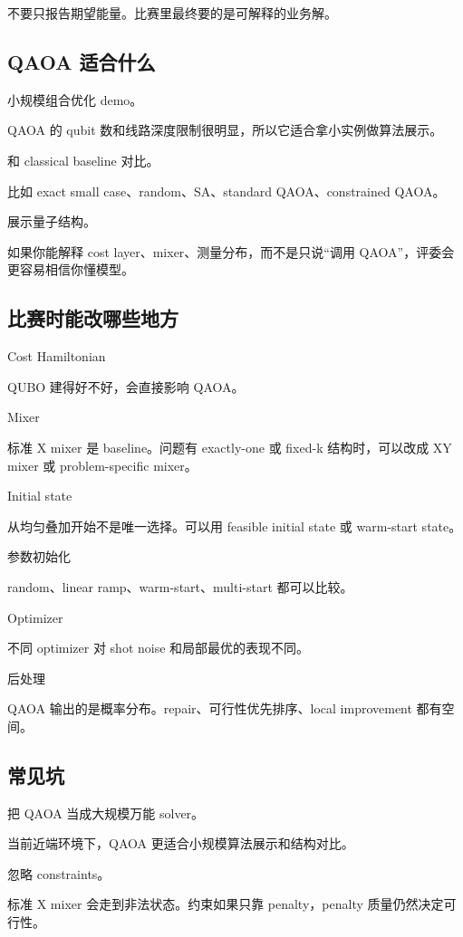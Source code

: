 \documentclass[UTF8,12pt,a4paper]{ctexart}
\begin{document}
不要只报告期望能量。比赛里最终要的是可解释的业务解。

\subsection*{QAOA 适合什么}

小规模组合优化 demo。

QAOA 的 qubit 数和线路深度限制很明显，所以它适合拿小实例做算法展示。

和 classical baseline 对比。

比如 exact small case、random、SA、standard QAOA、constrained QAOA。

展示量子结构。

如果你能解释 cost layer、mixer、测量分布，而不是只说“调用 QAOA”，评委会更容易相信你懂模型。

\subsection*{比赛时能改哪些地方}

Cost Hamiltonian

QUBO 建得好不好，会直接影响 QAOA。

Mixer

标准 X mixer 是 baseline。问题有 exactly-one 或 fixed-k 结构时，可以改成 XY mixer 或 problem-specific mixer。

Initial state

从均匀叠加开始不是唯一选择。可以用 feasible initial state 或 warm-start state。

参数初始化

random、linear ramp、warm-start、multi-start 都可以比较。

Optimizer

不同 optimizer 对 shot noise 和局部最优的表现不同。

后处理

QAOA 输出的是概率分布。repair、可行性优先排序、local improvement 都有空间。

\subsection*{常见坑}

把 QAOA 当成大规模万能 solver。

当前近端环境下，QAOA 更适合小规模算法展示和结构对比。

忽略 constraints。

标准 X mixer 会走到非法状态。约束如果只靠 penalty，penalty 质量仍然决定可行性。
\end{document}
